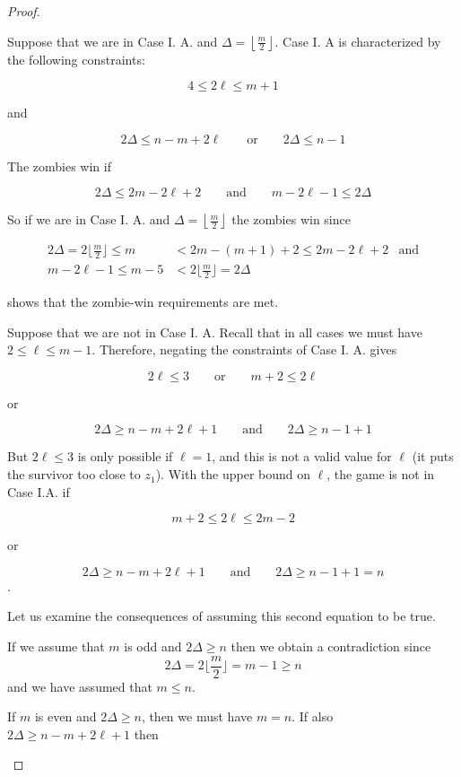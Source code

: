 \begin{proof}
\begin{proofpart}
Suppose that we are in Case I. A. and $\Delta = \left\lfloor \frac{m}{2} \right\rfloor$.
Case I. A is characterized by the following constraints:

\[ 4 \leq 2 \ell \leq m+1 \]
\begin{center}and\end{center}
\[ 2\Delta \leq n - m + 2\ell \qquad \text{or} \qquad 2\Delta \leq n-1 \]

The zombies win if

\[ 2 \Delta \leq 2 m- 2 \ell + 2 \qquad \text{and} \qquad m - 2\ell  -1 \leq 2 \Delta \]

So if we are in Case I. A. and $\Delta = \left\lfloor \frac{m}{2} \right\rfloor$ the zombies win since

\begin{align*}
  2 \Delta = 2 \lfloor \frac{m}{2} \rfloor \leq m &< 2m - (m+1) + 2\leq 2 m- 2 \ell + 2 & \text{and}\\
  m - 2\ell -1 \leq m - 5 &< 2 \lfloor \frac{m}{2} \rfloor = 2 \Delta
\end{align*}

shows that the zombie-win requirements are met.

Suppose that we are not in Case I. A. Recall that in all cases we must have $2 \leq \ell \leq m-1$. Therefore, negating the constraints of Case I. A. gives

\[2\ell \leq 3 \qquad \text{or} \qquad m+2 \leq 2 \ell \]
\begin{center}or\end{center}
\[ 2\Delta \geq n - m + 2\ell +1 \qquad \text{and} \qquad 2 \Delta \geq n - 1 + 1 \]

But $2\ell \leq 3$ is only possible if $\ell = 1$, and this is not a valid value for $\ell$ (it puts the survivor too close to $z_1$). With the upper bound on $\ell$, the game is not in Case I.A. if

\[m+2 \leq 2 \ell \leq 2m-2\]
\begin{center}or\end{center}
\[ 2\Delta \geq n - m + 2\ell +1 \qquad \text{and} \qquad 2 \Delta \geq n - 1 + 1 = n \].

Let us examine the consequences of assuming this second equation to be true.

If we assume that $m$ is odd and $2 \Delta \geq n$ then we obtain a contradiction since
\[ 2 \Delta = 2 \lfloor \frac{m}{2} \rfloor = m -1 \geq n \]
and we have assumed that $m \leq n$.

If $m$ is even and $2\Delta \geq n$, then we must have $m = n$. If also $2\Delta \geq n - m + 2\ell +1$ then


\end{proofpart}
\end{proof}
